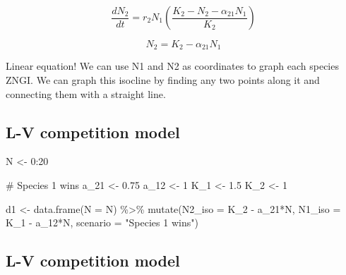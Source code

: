 \documentclass[
  letterpaper,
  DIV=11,
  numbers=noendperiod]{scrartcl}
\newenvironment{Shaded}{\begin{snugshade}}{\end{snugshade}}
\newcommand{\AttributeTok}[1]{\textcolor[rgb]{0.40,0.45,0.13}{#1}}
\newcommand{\CommentTok}[1]{\textcolor[rgb]{0.37,0.37,0.37}{#1}}
\newcommand{\DecValTok}[1]{\textcolor[rgb]{0.68,0.00,0.00}{#1}}
\newcommand{\FloatTok}[1]{\textcolor[rgb]{0.68,0.00,0.00}{#1}}
\newcommand{\FunctionTok}[1]{\textcolor[rgb]{0.28,0.35,0.67}{#1}}
\newcommand{\NormalTok}[1]{\textcolor[rgb]{0.00,0.23,0.31}{#1}}
\newcommand{\OtherTok}[1]{\textcolor[rgb]{0.00,0.23,0.31}{#1}}
\newcommand{\SpecialCharTok}[1]{\textcolor[rgb]{0.37,0.37,0.37}{#1}}
\newcommand{\StringTok}[1]{\textcolor[rgb]{0.13,0.47,0.30}{#1}}
\begin{document}
\[\frac{dN_2}{dt}=r_2N_1(\frac{K_2-N_2-\alpha_{21}N_1}{K_2})\]

\[N_2=K_2-\alpha_{21}N_1\]

Linear equation! We can use N1 and N2 as coordinates to graph each
species ZNGI. We can graph this isocline by finding any two points along
it and connecting them with a straight line.

\hypertarget{l-v-competition-model-3}{%
\subsection{L-V competition model}\label{l-v-competition-model-3}}

\begin{Shaded}
\begin{Highlighting}[]
\NormalTok{N }\OtherTok{\textless{}{-}} \DecValTok{0}\SpecialCharTok{:}\DecValTok{20}

\CommentTok{\# Species 1 wins}
\NormalTok{a\_21 }\OtherTok{\textless{}{-}} \FloatTok{0.75}
\NormalTok{a\_12 }\OtherTok{\textless{}{-}} \DecValTok{1}
\NormalTok{K\_1 }\OtherTok{\textless{}{-}} \FloatTok{1.5}
\NormalTok{K\_2 }\OtherTok{\textless{}{-}} \DecValTok{1}

\NormalTok{d1 }\OtherTok{\textless{}{-}} \FunctionTok{data.frame}\NormalTok{(}\AttributeTok{N =}\NormalTok{ N) }\SpecialCharTok{\%\textgreater{}\%} 
  \FunctionTok{mutate}\NormalTok{(}\AttributeTok{N2\_iso =}\NormalTok{ K\_2 }\SpecialCharTok{{-}}\NormalTok{ a\_21}\SpecialCharTok{*}\NormalTok{N,}
         \AttributeTok{N1\_iso =}\NormalTok{ K\_1 }\SpecialCharTok{{-}}\NormalTok{ a\_12}\SpecialCharTok{*}\NormalTok{N,}
         \AttributeTok{scenario =} \StringTok{"Species 1 wins"}\NormalTok{)}
\end{Highlighting}
\end{Shaded}

\hypertarget{l-v-competition-model-4}{%
\subsection{L-V competition model}\label{l-v-competition-model-4}}
\end{document}
